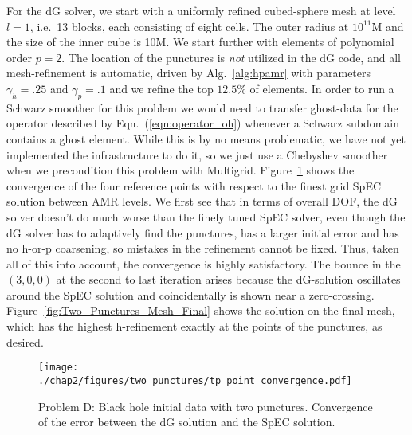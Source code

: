For the dG solver, we start with a uniformly refined cubed-sphere mesh
at level $l=1$, i.e.\ 13 blocks, each consisting of eight cells.  The  outer radius at $10^{11}$M and the size of the inner cube is 10M.  We start further with elements of  polynomial
order $p=2$.  The location of the punctures is \textit{not} utilized in the dG code, and all mesh-refinement is automatic, driven by Alg.~\ref{alg:hpamr}  with parameters $\gamma_h = .25$ and $\gamma_p = .1$ and we refine the top $12.5\%$ of elements. In order
to run a Schwarz smoother for this problem we would need to transfer
ghost-data for the operator described by Eqn.~(\ref{eqn:operator_oh})
whenever a Schwarz subdomain contains a ghost element. While this is
by no means problematic, we have not yet implemented the
infrastructure to do it, so we just use a Chebyshev smoother when we
precondition this problem with
Multigrid. Figure~\ref{fig:Two_Punctures_Mesh_Convergence} shows the
convergence of the four reference points with respect to the finest
grid SpEC solution between AMR levels. We first see that in terms of
overall DOF, the dG solver doesn't do much worse than the finely tuned
SpEC solver, even though the dG solver has to adaptively find the
punctures, has a larger initial error and has no h-or-p coarsening, so
mistakes in the refinement cannot be fixed. Thus, taken all of this
into account, the convergence is highly satisfactory.  The bounce
in the $(3,0,0)$ at the second to last iteration arises because the dG-solution oscillates around the SpEC solution and coincidentally is shown near a zero-crossing. Figure~\ref{fig:Two_Punctures_Mesh_Final} shows the solution on the final mesh, which has the highest h-refinement exactly at the points of the punctures, as desired.

\begin{figure}[ht!]
  \centering
  \texttt{[image: ./chap2/figures/two\_punctures/tp\_point\_convergence.pdf]}
  \caption{Problem D: Black hole initial data with two punctures.  Convergence of the error between the dG solution and the SpEC solution.
  }
  \label{fig:Two_Punctures_Mesh_Convergence} 
\end{figure}

